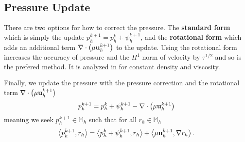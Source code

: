 \documentclass[letterpaper]{erdc}
\begin{document}
\subsection{Pressure Update}\label{sec:bdf2pressureupdate}
\begin{remark}
  There are two options for how to correct the pressure.  The \textbf{standard form} which is simply the update $p_h^{k+1} = p_h^{k} + \psi_h^{k+1}$, and the \textbf{rotational form} which adds an additional term $\nabla\cdot\left(\mu\textbf{u}^{k+1}_h\right)$ to the update.  Using the rotational form increases the accuracy of pressure and the $H^1$ norm of velocity by $\tau^{1/2}$ and so is the prefered method.  It is analyzed in \cite{guermond2004error} for constant density and viscosity.
\end{remark}
Finally, we update the pressure with the pressure correction and the rotational term $\nabla\cdot\left(\mu\textbf{u}^{k+1}_h\right)$
\begin{equation}
  p_h^{k+1} = p_h^{k} + \psi_h^{k+1} - \nabla\cdot\left(\mu\textbf{u}^{k+1}_h\right)
\end{equation}
meaning we seek $p_h^{k+1}\in \mathbb{M}_h$ such that for all $r_h\in \mathbb{M}_h$
\begin{equation}
  \left\langle p_h^{k+1}, r_h \right\rangle = \left\langle p_h^{k} + \psi_h^{k+1}, r_h \right\rangle + \left\langle \mu\textbf{u}_h^{k+1}, \nabla r_h \right\rangle.
\end{equation}
\end{document}
